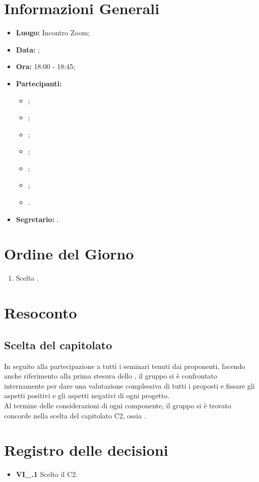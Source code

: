 \section{Informazioni Generali}
\begin{itemize}
\item \textbf{Luogo:} Incontro Zoom;
\item \textbf{Data:} \Data;
\item \textbf{Ora:} 18:00 - 18:45;
\item \textbf{Partecipanti:}
	\begin{itemize}
		\item \BL{}; 
		\item \FF{};
		\item \MM{}; 
		\item \PC{};
		\item \TG{};
		\item \TL{};
		\item \VD{}.
	\end{itemize} 
\item \textbf{Segretario:} \PC{}.
\end{itemize}

\section{Ordine del Giorno}
\begin{enumerate}
 \item Scelta .
\end{enumerate}

\section{Resoconto}
\subsection{Scelta del capitolato}
In seguito alla partecipazione a tutti i seminari tenuti dai proponenti, facendo anche riferimento alla prima stesura dello \SdF, il gruppo si è confrontato internamente per dare una valutazione complessiva di tutti i  proposti e fissare gli aspetti positivi e gli aspetti negativi di ogni progetto.\\
Al termine delle considerazioni di ogni componente, il gruppo si è trovato concorde nella scelta del capitolato C2, ossia \NomeProgetto.

\section{Registro delle decisioni}
\begin{itemize}
	\item \textbf{VI\_\Data.1} Scelto il  C2.
\end{itemize}
